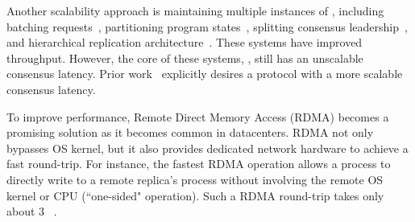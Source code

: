 Another scalability approach is maintaining multiple instances of \paxos, 
including batching requests~\cite{calvin:sigmod12}, partitioning program 
states~\cite{scatter:sosp11,ssmr:dsn14,ellis:thesis}, splitting consensus 
leadership~\cite{mencius:osdi08,spaxos:srds12}, and hierarchical 
replication architecture~\cite{manos:hotdep10,scatter:sosp11}. 
These systems have improved throughput. However, the core of these systems, 
\paxos, still has an unscalable consensus latency. Prior
work~\cite{scatter:sosp11,ellis:thesis,manos:hotdep10} explicitly desires a 
\paxos protocol with a more scalable consensus latency.





To improve \paxos performance, Remote Direct Memory Access (RDMA) becomes a 
promising solution as it becomes common in datacenters. RDMA not only bypasses 
OS kernel, but it also provides dedicated network hardware to achieve a fast 
round-trip. For instance, the fastest RDMA operation allows a process to 
directly write to a remote replica's process without involving the remote OS 
kernel or CPU (``one-sided" operation). Such a RDMA round-trip takes only about 
3 \us~\cite{pilaf:usenix14}.

